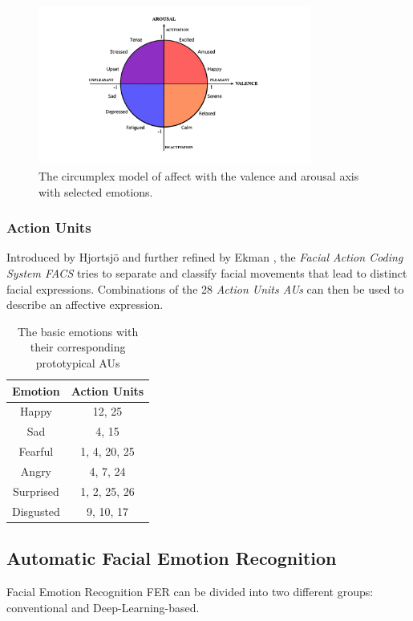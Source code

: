 \begin{figure}
    \centering
    \includegraphics[width=0.8\textwidth]{res/circumplex.png}
    \caption{The circumplex model of affect with the valence and arousal axis with selected emotions. \cite{russell1980circumplex} \cite{pourmirzaei2021an}}
    \label{fig:circumplexImg}
\end{figure}

\subsubsection{Action Units}
\label{subsub:au}

Introduced by Hjortsjö \cite{hjortsjo1969man} and further refined by Ekman \cite{friesen1978facial}, the \emph{Facial Action Coding System FACS} tries to separate and classify facial movements that lead to distinct facial expressions. Combinations of the 28 \emph{Action Units AUs} can then be used to describe an affective expression.

\begin{table}[]
    \centering
    \begin{tabular}{c|c}
       \textbf{Emotion}  & \textbf{Action Units} \\ \hline
        Happy & 12, 25 \\
        Sad & 4, 15 \\
        Fearful & 1, 4, 20, 25 \\
        Angry & 4, 7, 24 \\
        Surprised & 1, 2, 25, 26 \\
        Disgusted & 9, 10, 17
    \end{tabular}
    \caption{The basic emotions with their corresponding prototypical AUs \cite{fabian2016emotionet}}
    \label{tab:emotionAUs}
\end{table}

\subsection{Automatic Facial Emotion Recognition}
Facial Emotion Recognition FER can be divided into two different groups: conventional and Deep-Learning-based. \cite{ko2018brief}

